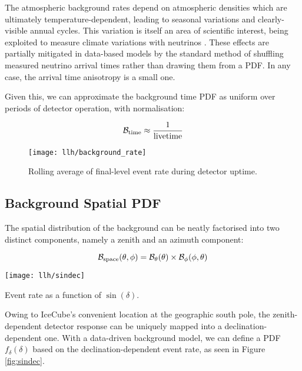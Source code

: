 The atmospheric background rates depend on atmospheric densities which are ultimately temperature-dependent, leading to seasonal variations and clearly-visible annual cycles. This variation is itself an area of scientific interest, being exploited to measure climate variations with neutrinos . These effects are partially mitigated in data-based models by the standard method of shuffling measured neutrino arrival times rather than drawing them from a PDF. In any case, the arrival time anisotropy is a small one.

Given this, we can approximate the background time PDF as uniform over periods of detector operation, with normalisation:

\begin{equation}
\mathcal{B}_{\textup{time}} \approx \frac{1}{\textup{livetime}}
\end{equation}

\begin{figure}[!ht]
	\centering \texttt{[image: llh/background\_rate]}
	\caption{Rolling average of final-level event rate during detector uptime.}
	\label{fig:background_rate}
\end{figure}

\subsection*{Background Spatial PDF}

The spatial distribution of the background can be neatly factorised into two distinct components, namely a zenith and an azimuth component:

\begin{equation}
	\mathcal{B}_{\textup{space}} (\theta, \phi) = \mathcal{B}_{\theta}(\theta) \times \mathcal{B}_{\phi}(\phi, \theta)
	\label{eq:b_space_local}
\end{equation}


\begin{marginfigure}
	\centering \texttt{[image: llh/sindec]}
	\caption{Event rate as a function of $\sin(\delta)$.}
	\label{fig:sindec}
\end{marginfigure}

Owing to IceCube's convenient location at the geographic south pole, the zenith-dependent detector response can be uniquely mapped into a declination-dependent one. With a data-driven background model, we can define a PDF $f_{\delta}(\delta)$ based on the declination-dependent event rate, as seen in Figure \ref{fig:sindec}.

